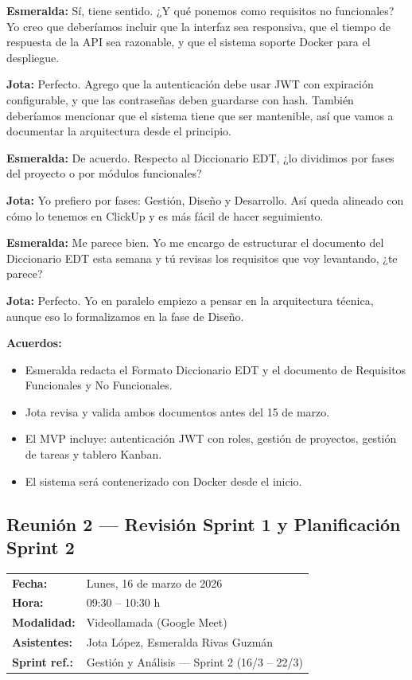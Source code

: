 \documentclass[12pt, a4paper]{article}
\makeatletter
\newcommand{\actaheader}[5]{%
  \begin{mdframed}[
    backgroundcolor=sectionbg,
    linecolor=bordercolor,
    linewidth=1pt,
    innerleftmargin=12pt, innerrightmargin=12pt,
    innertopmargin=10pt, innerbottommargin=10pt,
    skipabove=8pt, skipbelow=8pt
  ]
  \begin{tabularx}{\linewidth}{@{}lX@{}}
    \textbf{Fecha:}       & #1 \\[2pt]
    \textbf{Hora:}        & #2 \\[2pt]
    \textbf{Modalidad:}   & #3 \\[2pt]
    \textbf{Asistentes:}  & #4 \\[2pt]
    \textbf{Sprint ref.:} & #5 \\
  \end{tabularx}
  \end{mdframed}%
}
\newcommand{\jota}[1]{\noindent\textbf{\color{primary}Jota:} #1\par\smallskip}
\newcommand{\esme}[1]{\noindent\textbf{\color{accentgreen}Esmeralda:} #1\par\smallskip}
\makeatother
\begin{document}
\esme{Sí, tiene sentido. ¿Y qué ponemos como requisitos no funcionales? Yo creo que deberíamos incluir que la interfaz sea responsiva, que el tiempo de respuesta de la API sea razonable, y que el sistema soporte Docker para el despliegue.}

\jota{Perfecto. Agrego que la autenticación debe usar JWT con expiración configurable, y que las contraseñas deben guardarse con hash. También deberíamos mencionar que el sistema tiene que ser mantenible, así que vamos a documentar la arquitectura desde el principio.}

\esme{De acuerdo. Respecto al Diccionario EDT, ¿lo dividimos por fases del proyecto o por módulos funcionales?}

\jota{Yo prefiero por fases: Gestión, Diseño y Desarrollo. Así queda alineado con cómo lo tenemos en ClickUp y es más fácil de hacer seguimiento.}

\esme{Me parece bien. Yo me encargo de estructurar el documento del Diccionario EDT esta semana y tú revisas los requisitos que voy levantando, ¿te parece?}

\jota{Perfecto. Yo en paralelo empiezo a pensar en la arquitectura técnica, aunque eso lo formalizamos en la fase de Diseño.}

\begin{acuerdobox}
\textbf{Acuerdos:}
\begin{itemize}[leftmargin=1.2em, topsep=2pt]
  \item Esmeralda redacta el Formato Diccionario EDT y el documento de Requisitos Funcionales y No Funcionales.
  \item Jota revisa y valida ambos documentos antes del 15 de marzo.
  \item El MVP incluye: autenticación JWT con roles, gestión de proyectos, gestión de tareas y tablero Kanban.
  \item El sistema será contenerizado con Docker desde el inicio.
\end{itemize}
\end{acuerdobox}

\subsection{Reunión 2 — Revisión Sprint 1 y Planificación Sprint 2}
\actaheader
  {Lunes, 16 de marzo de 2026}
  {09:30 -- 10:30 h}
  {Videollamada (Google Meet)}
  {Jota López, Esmeralda Rivas Guzmán}
  {Gestión y Análisis — Sprint 2 (16/3 -- 22/3)}
\end{document}
